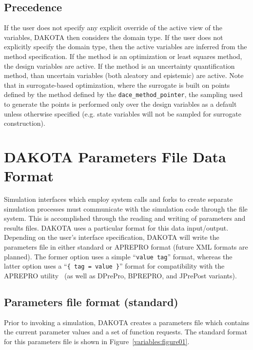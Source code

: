 \subsection{Precedence}\label{variables:precedence}
If the user does not specify any explicit override of the active view 
of the variables, DAKOTA then considers the domain type. 
If the user does not explicitly specify the domain type, then 
the active variables are inferred from the method specification. 
If the method is an optimization or least squares method, the design 
variables are active.  If the method is an uncertainty quantification 
method, than uncertain variables (both aleatory and epistemic) are active. 
Note that in surrogate-based optimization, where the surrogate 
is built on points defined by the method defined by the 
\texttt{dace\_method\_pointer}, the sampling used to generate the points 
is performed only over the design variables as a default unless 
otherwise specified (e.g. state variables will not be sampled 
for surrogate construction). 
  
\section{DAKOTA Parameters File Data Format}\label{variables:parameters}

Simulation interfaces which employ system calls and forks to create
separate simulation processes must communicate with the simulation
code through the file system. This is accomplished through the reading
and writing of parameters and results files. DAKOTA uses a particular
format for this data input/output. Depending on the user's interface
specification, DAKOTA will write the parameters file in either
standard or APREPRO format (future XML formats are planned). The
former option uses a simple ``\texttt{value tag}'' format, whereas the
latter option uses a ``\texttt{\{ tag = value \}}'' format for
compatibility with the APREPRO utility~\cite{Sja92} (as well as
DPrePro, BPREPRO, and JPrePost variants).

\subsection{Parameters file format (standard)}\label{variables:parameters:standard}

Prior to invoking a simulation, DAKOTA creates a parameters file which
contains the current parameter values and a set of function requests.
The standard format for this parameters file is shown in
Figure~\ref{variables:figure01}.

